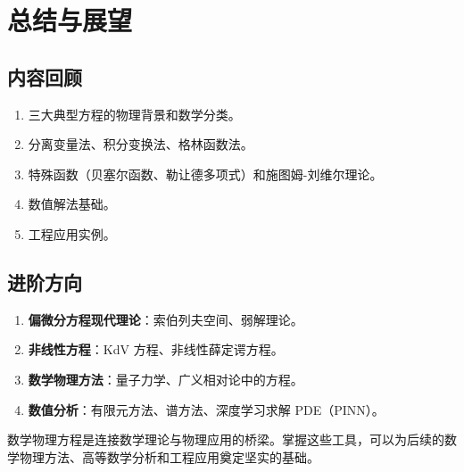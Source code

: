 ﻿\chapter{总结与展望}

\section{内容回顾}

\begin{enumerate}
	\item 三大典型方程的物理背景和数学分类。
	\item 分离变量法、积分变换法、格林函数法。
	\item 特殊函数（贝塞尔函数、勒让德多项式）和施图姆-刘维尔理论。
	\item 数值解法基础。
	\item 工程应用实例。
\end{enumerate}

\section{进阶方向}

\begin{enumerate}
	\item \textbf{偏微分方程现代理论}：索伯列夫空间、弱解理论。
	\item \textbf{非线性方程}：KdV 方程、非线性薛定谔方程。
	\item \textbf{数学物理方法}：量子力学、广义相对论中的方程。
	\item \textbf{数值分析}：有限元方法、谱方法、深度学习求解 PDE（PINN）。
\end{enumerate}

\begin{remark}
数学物理方程是连接数学理论与物理应用的桥梁。掌握这些工具，可以为后续的数学物理方法、高等数学分析和工程应用奠定坚实的基础。
\end{remark}
